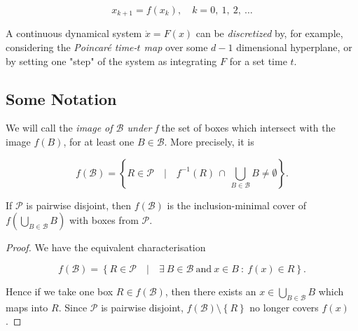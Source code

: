 \begin{equation}
    x_{k+1} = f(x_k), \quad k = 0,\ 1,\ 2,\ \dotsc
\end{equation}

A continuous dynamical system $\dot{x} = F(x)$ can be \emph{discretized} by, for example,
considering the \emph{Poincaré time-$t$ map} over some $d-1$ dimensional hyperplane,
or by setting one "step" of the system as integrating $F$ for a set time $t$. 


\subsection{Some Notation}

\begin{definition}
    We will call the \emph{image of $\mathcal{B}$ under f} 
    the set of boxes which intersect with the image $f(B)$, for at least one 
    $B \in \mathcal{B}$. More precisely, it is 
    
    \begin{equation}
        f (\mathcal{B}) = \left\{
            R \in \mathcal{P} \quad \vert \quad 
            f^{-1} (R)\, \cap\, \bigcup\limits_{B \in \mathcal{B}} B \neq \emptyset
        \right\}.
    \end{equation}

\end{definition}

\begin{theorem}
    If $\mathcal{P}$ is pairwise disjoint, then 
    $f(\mathcal{B})$ is the inclusion-minimal cover of $f(\bigcup_{B \in \mathcal{B}} B)$
    with boxes from $\mathcal{P}$.
\end{theorem}

\begin{proof}
    We have the equivalent characterisation

    \begin{equation}
        f(\mathcal{B}) = \left\{
            R \in \mathcal{P} \quad \vert \quad
            \exists\ B \in \mathcal{B}\ \text{and}\ x \in B\ :\ f(x) \in R
        \right\}.
    \end{equation}

    Hence if we take one box $R \in f(\mathcal{B})$, then there exists an 
    $x \in \bigcup_{B \in \mathcal{B}} B$ which maps into $R$. Since 
    $\mathcal{P}$ is pairwise disjoint, $f(\mathcal{B}) \setminus \left\{ R \right\}$ 
    no longer covers $f(x)$. 
\end{proof}

